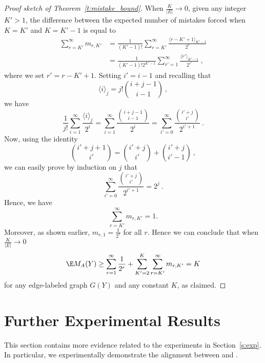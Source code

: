 \begin{proof}[Proof sketch of Theorem~\ref{t:mistake_bound}]
When $\frac{K}{|E|} \rightarrow 0$, given any integer $K'>1$, the difference between the expected number of mistakes forced when $K=K'$ and $K=K'-1$ is equal to
%
\begin{align*}
\sum_{r=K'}^{\infty} m_{r,K'}
&=
\frac{1}{(K'-1)!}\sum_{r=K'}^{\infty} \frac{\langle r-K'+1\rangle_{K'-1}}{2^{r}}\\
&=
\frac{1}{(K'-1)!2^{K'-1}}\sum_{r'=1}^{\infty} \frac{\langle r'\rangle_{K'-1}}{2^{r'}}~,
\end{align*}
% 
where we set $r'=r-K'+1$.
Setting $i'=i-1$ and recalling that
\[
\langle i\rangle_j=j!{{i+j-1}\choose{i-1}}~,
\]
we have
\[
\frac{1}{j!}\sum_{i=1}^{\infty}\frac{\langle i\rangle_j}{2^i}=
\sum_{i=1}^{\infty}\frac{{{i+j-1}\choose{i-1}}}{2^i}=
\sum_{i'=0}^{\infty}\frac{{{i'+j}\choose{i'}}}{2^{i'+1}}~.
\]
Now, using the identity
\[
{i'+j+1 \choose i'} = {i'+j \choose i'} + {i'+j \choose i'-1}~,
\]
we can easily prove by induction on $j$ that
\[
\sum_{i'=0}^{\infty}\frac{{{i'+j}\choose{i'}}}{2^{i'+1}}=2^j~.
\]
Hence, we have
\[
\sum_{r=K'}^{\infty} m_{r,K'}=1.
\]
Moreover, as shown earlier, $m_{r,1}=\frac{1}{2^{r}}$ for all $r$. Hence we can conclude that when $\frac{K}{|E|} \rightarrow 0$ 
\[
\E M_A(Y) \ge
\sum_{r=1}^{\infty} \frac{1}{2^{r}} +
\sum_{K'=2}^{K} \sum_{r=K'}^{\infty} m_{r,K'}=K
\]
for any edge-labeled graph $G(Y)$ and any constant $K$, as claimed.
\end{proof}


\iffalse %
In the special case when the bias is
\[
    \Psi(Y) = \min\big\{\Psiin(Y),\Psiout(Y)\big\}
\]
where
\[
    \Psiin(Y) = \sum_{j \in V} \min\big\{\din^-(j),\din^+(j)\big\}
\]
and
\[
    \Psiout(Y) = \sum_{i \in V} \min\big\{\dout^-(i),\dout^+(i)\big\}
\]
then using Randomized Weighted Majority on the two experts
\[
    \Yhat^{(1)}_{i,j} = \sgn\left(\frac{1}{2}-\frac{\hdout^-(i)}{\hdout(i)}\right)
\qquad\text{and}\qquad
    \Yhat^{(2)}_{i,j} = \sgn\left(\frac{1}{2}-\frac{\hdin^-(j)}{\hdin(j)}\right)
\]
we get an expected mistake bound of
\[
    2\Psi(Y) + \sqrt{(4\ln 2) \Psi(Y)}~.
\]
\fi %



\section{Further Experimental Results}
%
This section contains more evidence related to the experiments in Section~\ref{s:exp}.
In particular, we experimentally demonstrate the alignment between \usrule{} and \uslogregp{}.



